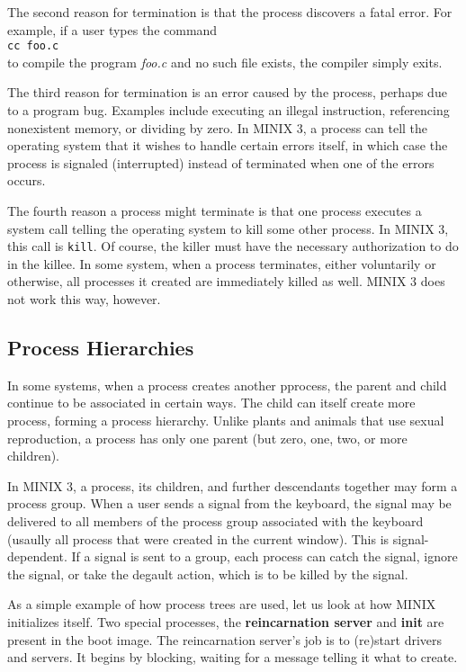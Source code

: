 \documentclass{book}
\newcommand {\kw}  [1] {\textbf{#1}}
\newcommand {\sys} [1] {\textsl{#1}}
\newcommand {\cmd} [1] {\texttt{#1}}
\begin{document}
The second reason for termination is that the process discovers a fatal error.
For example, if a user types the command\\
\cmd{cc foo.c}\\
to compile the program \sys{foo.c} and no such file exists, the compiler simply exits.

The third reason for termination is an error caused by the process, perhaps due to a program bug.
Examples include executing an illegal instruction, referencing nonexistent memory, or dividing by zero.
In MINIX 3, a process can tell the operating system that it wishes to handle certain errors itself,
in which case the process is signaled (interrupted) instead of terminated when one of the errors occurs.

The fourth reason a process might terminate is that one process executes a system call telling the operating system to kill some other process.
In MINIX 3, this call is \cmd{kill}.
Of course, the killer must have the necessary authorization to do in the killee.
In some system, when a process terminates, either voluntarily or otherwise,
all processes it created are immediately killed as well.
MINIX 3 does not work this way, however.

\subsection{Process Hierarchies}
In some systems, when a process creates another pprocess,
the parent and child continue to be associated in certain ways.
The child can itself create more process, forming a process hierarchy.
Unlike plants and animals that use sexual reproduction,
a process has only one parent (but zero, one, two, or more children).

In MINIX 3, a process, its children, and further descendants together may form a process group.
When a user sends a signal from the keyboard, the signal may be delivered to all members of the process group
associated with the keyboard (usaully all process that were created in the current window).
This is signal-dependent.
If a signal is sent to a group, each process can catch the signal, ignore the signal, or take the degault action,
which is to be killed by the signal.

As a simple example of how process trees are used, let us look at how MINIX initializes itself.
Two special processes, the \kw{reincarnation server} and \kw{init} are present in the boot image.
The reincarnation server's job is to (re)start drivers and servers.
It begins by blocking, waiting for a message telling it what to create.
\end{document}
